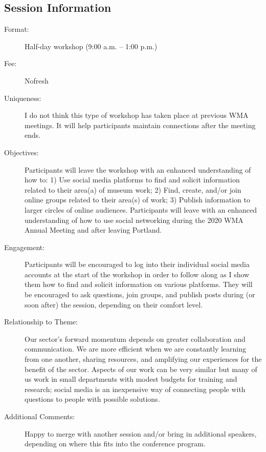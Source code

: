 \documentclass{report}
\begin{document}
              \subsection*{Session Information}
                \begin{description}
                  \item [Format:] Half-day workshop (9:00 a.m. – 1:00 p.m.)
							    
								  \item [Fee:]Nofresh 
							     
							    \item [Uniqueness:]I do not think this type of workshop has taken place at previous WMA meetings. It will help participants maintain connections after the meeting ends.
							    \item [Objectives:]Participants will leave the workshop with an enhanced understanding of how to: 1) Use social media platforms to find and solicit information related to their area(a) of museum work; 2) Find, create, and/or join online groups related to their area(s) of work; 3) Publish information to larger circles of online audiences.  Participants will leave with an enhanced understanding of how to use social networking during the 2020 WMA Annual Meeting and after leaving Portland.
							    \item [Engagement:]Participants will be encouraged to log into their individual social media accounts at the start of the workshop in order to follow along as I show them how to find and solicit information on various platforms. They will be encouraged to ask questions, join groups, and publish posts during (or soon after) the session, depending on their comfort level.
							    \item [Relationship to Theme:]Our sector’s forward momentum depends on greater collaboration and communication. We are more efficient when we are constantly learning from one another, sharing resources, and amplifying our experiences for the benefit of the sector. Aspects of our work can be very similar but many of us work in small departments with modest budgets for training and research; social media is an inexpensive way of connecting people with questions to people with possible solutions.
							    
                    \item [Additional Comments: ]Happy to merge with another session and/or bring in additional speakers, depending on where this fits into the conference program.

                \end{description}
\end{document}

